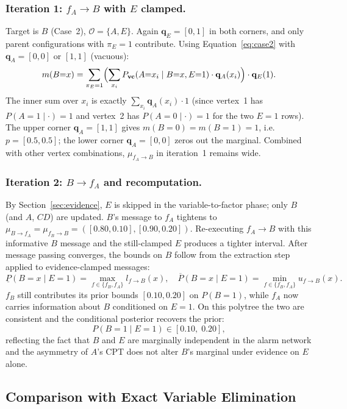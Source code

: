 \documentclass[11pt]{article}
\begin{document}
\subsubsection{Iteration 1: $f_A \to B$ with $E$ clamped.}
Target is $B$ (Case~2), $\mathcal{O} = \{A, E\}$. Again $\mathbf{q}_E = [0, 1]$
in both corners, and only parent configurations with $\pi_E = 1$ contribute.
Using Equation~\ref{eq:case2} with $\mathbf{q}_A = [0, 0]$ or $[1, 1]$
(vacuous):
\[
  m(B{=}x) = \sum_{\pi_E = 1}
             \Bigl(\sum_{x_i} P_{\mathbf{vc}}(A{=}x_i \mid B{=}x, E{=}1)
                   \cdot \mathbf{q}_A(x_i)\Bigr) \cdot \mathbf{q}_E(1).
\]
The inner sum over $x_i$ is exactly $\sum_{x_i} \mathbf{q}_A(x_i) \cdot 1$
(since vertex~1 has $P(A{=}1 \mid \cdot) = 1$ and vertex~2 has
$P(A{=}0 \mid \cdot) = 1$ for the two $E{=}1$ rows). The upper corner
$\mathbf{q}_A = [1,1]$ gives $m(B{=}0) = m(B{=}1) = 1$, i.e.\ $p = [0.5, 0.5]$;
the lower corner $\mathbf{q}_A = [0,0]$ zeros out the marginal. Combined with
other vertex combinations, $\mu_{f_A \to B}$ in iteration~1 remains wide.

\subsubsection{Iteration 2: $B \to f_A$ and recomputation.}
By Section~\ref{sec:evidence}, $E$ is skipped in the variable-to-factor phase;
only $B$ (and $A$, $CD$) are updated. $B$'s message to $f_A$ tightens to
$\mu_{B \to f_A} = \mu_{f_B \to B} = ([0.80, 0.10], [0.90, 0.20])$.
Re-executing $f_A \to B$ with this informative $B$ message and the still-clamped
$E$ produces a tighter interval. After message passing converges, the bounds on
$B$ follow from the extraction step applied to evidence-clamped messages:
\[
  \underline{P}(B{=}x \mid E{=}1) = \max_{f \in \{f_B, f_A\}} l_{f \to B}(x),
  \quad
  \overline{P}(B{=}x \mid E{=}1) = \min_{f \in \{f_B, f_A\}} u_{f \to B}(x).
\]
$f_B$ still contributes its prior bounds $[0.10, 0.20]$ on $P(B{=}1)$, while
$f_A$ now carries information about $B$ conditioned on $E{=}1$. On this
polytree the two are consistent and the conditional posterior recovers the
prior:
\[
  P(B{=}1 \mid E{=}1) \in [0.10,\; 0.20],
\]
reflecting the fact that $B$ and $E$ are marginally independent in the alarm
network and the asymmetry of $A$'s CPT does not alter $B$'s marginal under
evidence on $E$ alone.

\subsection{Comparison with Exact Variable Elimination}
\end{document}
